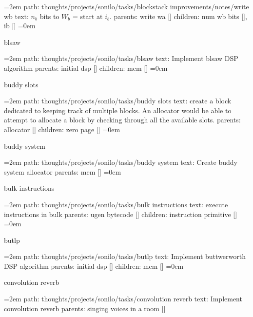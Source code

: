 \leftskip=2em
path: thoughts/projects/sonilo/tasks/blockstack improvements/notes/write wb
\smallskip
text:  $n_b$ bits to $W_b$ = start at $i_b$.
\smallskip
parents:  write wa []
\smallskip
children: num wb bits [], ib []
\smallskip
\leftskip=0em
\par\endgroup
\bigskip
{}
blsaw
\smallskip
\par\begingroup
\leftskip=2em
path: thoughts/projects/sonilo/tasks/blsaw
\smallskip
text:  Implement blsaw DSP algorithm
\smallskip
parents:  initial dsp []
\smallskip
children: mem []
\smallskip
\leftskip=0em
\par\endgroup
\bigskip
{}
buddy slots
\smallskip
\par\begingroup
\leftskip=2em
path: thoughts/projects/sonilo/tasks/buddy slots
\smallskip
text:  create a block dedicated to keeping track of multiple blocks. An allocator would be able to attempt to allocate a block by checking through all the available slots.
\smallskip
parents:  allocator []
\smallskip
children: zero page []
\smallskip
\leftskip=0em
\par\endgroup
\bigskip
{}
buddy system
\smallskip
\par\begingroup
\leftskip=2em
path: thoughts/projects/sonilo/tasks/buddy system
\smallskip
text:  Create buddy system allocator
\smallskip
parents:  mem []
\smallskip
\leftskip=0em
\par\endgroup
\bigskip
{}
bulk instructions
\smallskip
\par\begingroup
\leftskip=2em
path: thoughts/projects/sonilo/tasks/bulk instructions
\smallskip
text:  execute instructions in bulk
\smallskip
parents:  ugen bytecode []
\smallskip
children: instruction primitive []
\smallskip
\leftskip=0em
\par\endgroup
\bigskip
{}
butlp
\smallskip
\par\begingroup
\leftskip=2em
path: thoughts/projects/sonilo/tasks/butlp
\smallskip
text:  Implement buttwerworth DSP algorithm
\smallskip
parents:  initial dsp []
\smallskip
children: mem []
\smallskip
\leftskip=0em
\par\endgroup
\bigskip
{}
convolution reverb
\smallskip
\par\begingroup
\leftskip=2em
path: thoughts/projects/sonilo/tasks/convolution reverb
\smallskip
text:  Implement convolution reverb
\smallskip
parents:  singing voices in a room []
\smallskip
